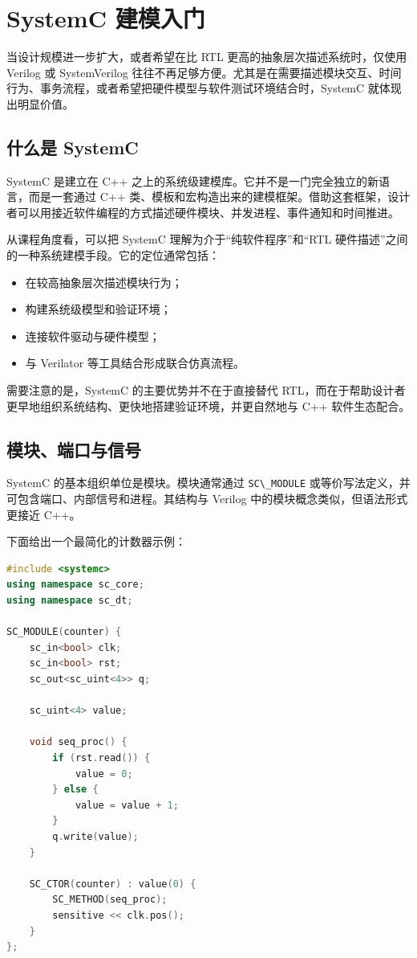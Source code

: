 \section{SystemC 建模入门}\label{systemc-ux5efaux6a21ux5165ux95e8}

当设计规模进一步扩大，或者希望在比 RTL 更高的抽象层次描述系统时，仅使用
Verilog 或 SystemVerilog
往往不再足够方便。尤其是在需要描述模块交互、时间行为、事务流程，或者希望把硬件模型与软件测试环境结合时，SystemC
就体现出明显价值。

\subsection{什么是 SystemC}\label{ux4ec0ux4e48ux662f-systemc}

SystemC 是建立在 C++
之上的系统级建模库。它并不是一门完全独立的新语言，而是一套通过 C++
类、模板和宏构造出来的建模框架。借助这套框架，设计者可以用接近软件编程的方式描述硬件模块、并发进程、事件通知和时间推进。

从课程角度看，可以把 SystemC 理解为介于``纯软件程序''和``RTL
硬件描述''之间的一种系统建模手段。它的定位通常包括：

\begin{itemize}
\tightlist
\item
  在较高抽象层次描述模块行为；
\item
  构建系统级模型和验证环境；
\item
  连接软件驱动与硬件模型；
\item
  与 Verilator 等工具结合形成联合仿真流程。
\end{itemize}

需要注意的是，SystemC 的主要优势并不在于直接替代
RTL，而在于帮助设计者更早地组织系统结构、更快地搭建验证环境，并更自然地与
C++ 软件生态配合。

\subsection{模块、端口与信号}\label{ux6a21ux5757ux7aefux53e3ux4e0eux4fe1ux53f7}

SystemC 的基本组织单位是模块。模块通常通过
\passthrough{\lstinline!SC\_MODULE!}
或等价写法定义，并可包含端口、内部信号和进程。其结构与 Verilog
中的模块概念类似，但语法形式更接近 C++。

下面给出一个最简化的计数器示例：

\begin{lstlisting}[language={C++}]
#include <systemc>
using namespace sc_core;
using namespace sc_dt;

SC_MODULE(counter) {
    sc_in<bool> clk;
    sc_in<bool> rst;
    sc_out<sc_uint<4>> q;

    sc_uint<4> value;

    void seq_proc() {
        if (rst.read()) {
            value = 0;
        } else {
            value = value + 1;
        }
        q.write(value);
    }

    SC_CTOR(counter) : value(0) {
        SC_METHOD(seq_proc);
        sensitive << clk.pos();
    }
};
\end{lstlisting}

